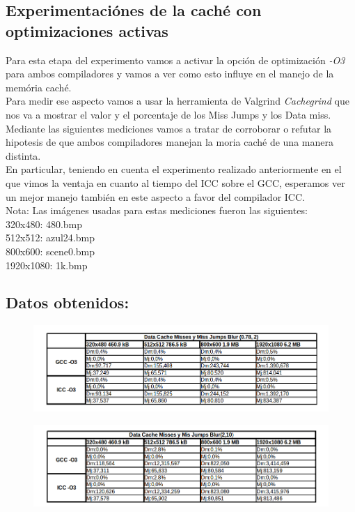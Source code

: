 \subsection{Experimentaciónes de la caché con optimizaciones activas}

Para esta etapa del experimento vamos a activar la opción de optimización \textit{-O3} para ambos compiladores y vamos a ver como esto influye en el manejo de la memória caché.\\
Para medir ese aspecto vamos a usar la herramienta de Valgrind \textit{Cachegrind} que nos va a mostrar el valor y el porcentaje de los Miss Jumps y los Data miss.\\
 Mediante las siguientes mediciones vamos a tratar de corroborar o refutar la hipotesis de que ambos compiladores manejan la moria caché de una manera distinta.\\
En particular, teniendo en cuenta el experimento realizado anteriormente en el que vimos la ventaja en cuanto al tiempo del ICC sobre el GCC, esperamos ver un mejor manejo también en este aspecto a favor del compilador ICC.\\
Nota: Las imágenes usadas para estas mediciones fueron las siguientes:\\
320x480: 480.bmp\\
512x512: azul24.bmp\\
800x600: scene0.bmp\\
1920x1080: 1k.bmp \\


\subsection{Datos obtenidos:}

\begin{figure}[H]
\begin{center}
  \includegraphics[width=\linewidth]{cachecompiladores/blur0782.png}
\end{center}
\end{figure}

\begin{figure}[H]
\begin{center}
  \includegraphics[width=\linewidth]{cachecompiladores/blur15.png}
\end{center}
\end{figure}


